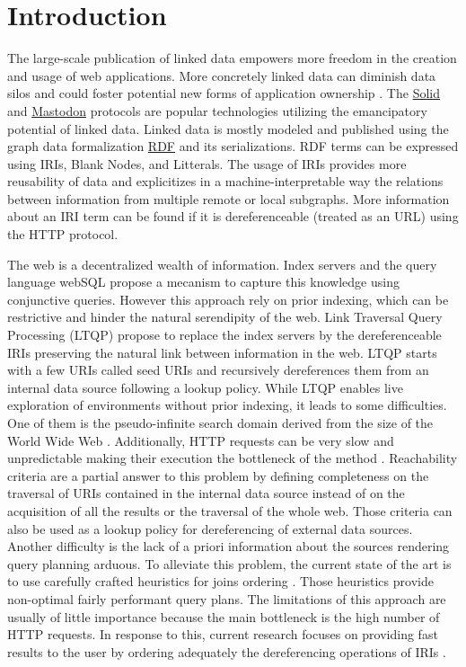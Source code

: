 
\section{Introduction}
 
The large-scale publication of linked data empowers more freedom in the creation and usage of web applications.
More concretely linked data can diminish data silos \cite{Verstraete2022}
and could foster potential new forms of application ownership \cite{Mechant2021}.
The \href{https://solidproject.org/TR/protocol}{Solid} and
\href{https://docs.joinmastodon.org/}{Mastodon} protocols
are popular technologies utilizing the emancipatory potential of linked data.
Linked data is mostly modeled and published using the graph data formalization \href{https://www.w3.org/TR/rdf12-concepts/}{RDF} and its serializations.
RDF terms can be expressed using IRIs, Blank Nodes, and Litterals.
The usage of IRIs provides more reusability of data and explicitizes in a machine-interpretable way the relations between
information from multiple remote or local subgraphs.
More information about an IRI term can be found if it is dereferenceable (treated as an URL) using the HTTP protocol.


The web is a decentralized wealth of information.
Index servers and the query language webSQL \cite{Mendelzon1996} propose a mecanism to capture this knowledge using conjunctive queries.
However this approach rely on prior indexing, which can be restrictive and hinder the natural serendipity of the web. 
Link Traversal Query Processing (LTQP) \cite{Hartig2012} propose to replace the index servers by the dereferenceable IRIs 
preserving the natural link between information in the web.
LTQP starts with a few URIs called seed URIs and recursively dereferences them from an internal data source following a lookup policy.
While LTQP enables live exploration of environments without prior indexing, it leads to some difficulties.
One of them is the pseudo-infinite search domain derived from the size of the World Wide Web \cite{Hartig2014}.
Additionally, HTTP requests can be very slow and unpredictable making their execution the bottleneck of the method \cite{hartig2016walking}.
Reachability criteria \cite{Hartig2012} are a partial answer to this problem by defining completeness on the traversal of URIs
contained in the internal data source instead of on the acquisition of all the results or the traversal of the whole web.
Those criteria can also be used as a lookup policy for dereferencing of external data sources.
Another difficulty is the lack of a priori information about the sources rendering query planning arduous.
To alleviate this problem, the current state of the art is to use carefully crafted heuristics for joins ordering \cite{Hartig2011}.
Those heuristics provide non-optimal fairly performant query plans.
The limitations of this approach are usually of little importance because the main bottleneck is the high number of HTTP requests.
In response to this, current research focuses on providing fast results to the user by ordering adequately the dereferencing operations of IRIs \cite{hartig2016walking}.

